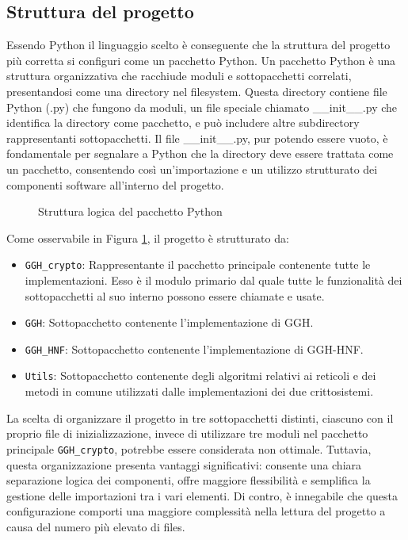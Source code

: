 \subsection{Struttura del progetto}
\label{sec:struttura}
Essendo Python il linguaggio scelto è conseguente che la struttura del progetto più corretta
si configuri come un pacchetto Python. Un pacchetto Python è una struttura organizzativa che 
racchiude moduli e sottopacchetti correlati, presentandosi come una directory nel filesystem.
Questa directory contiene file Python (.py) che fungono da moduli, un file speciale chiamato 
\_\_init\_\_.py che identifica la directory come pacchetto, e può includere altre subdirectory 
rappresentanti sottopacchetti. 
Il file \_\_init\_\_.py, pur potendo essere vuoto, è fondamentale per segnalare a Python che la 
directory deve essere trattata come un pacchetto, consentendo così un'importazione e un 
utilizzo strutturato dei componenti software all'interno del progetto.\\

\begin{figure}[h]
    \centering
    \begin{minipage}{7cm}
    \end{minipage}
    \caption{Struttura logica del pacchetto Python}
    \label{fig:pythonpackage}
\end{figure}

Come osservabile in Figura \ref{fig:pythonpackage}, il progetto è strutturato da:
\begin{itemize}
    \item \texttt{GGH\_crypto}: Rappresentante il pacchetto principale contenente tutte le implementazioni. 
    Esso è il modulo primario dal quale tutte le funzionalità dei
    sottopacchetti al suo interno possono essere chiamate e usate. 
    \item \texttt{GGH}: Sottopacchetto contenente l'implementazione di GGH.
    \item \texttt{GGH\_HNF}: Sottopacchetto contenente l'implementazione di GGH-HNF.
    \item \texttt{Utils}: Sottopacchetto contenente degli algoritmi relativi ai reticoli e 
    dei metodi in comune utilizzati dalle implementazioni dei due crittosistemi. 
\end{itemize}

La scelta di organizzare il progetto in tre sottopacchetti distinti, ciascuno con il proprio 
file di inizializzazione, invece di utilizzare tre moduli nel pacchetto principale \texttt{GGH\_crypto}, 
potrebbe essere considerata non ottimale. 
Tuttavia, questa organizzazione presenta vantaggi significativi: consente una chiara 
separazione logica dei componenti, offre maggiore flessibilità e semplifica la 
gestione delle importazioni tra i vari elementi. Di contro, è innegabile che 
questa configurazione comporti una maggiore complessità nella lettura del progetto 
a causa del numero più elevato di files.